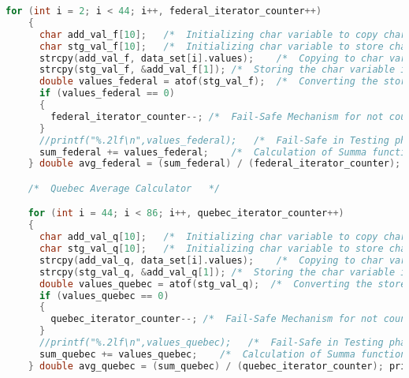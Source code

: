 \begin{lstlisting}[language=C, caption=\textit{CPS 188 Term Project Source Code}]
    for (int i = 2; i < 44; i++, federal_iterator_counter++)
    {
      char add_val_f[10];   /*  Initializing char variable to copy char pointer to char variable type   */
      char stg_val_f[10];   /*  Initializing char variable to store char to char recieved from char pointer */
      strcpy(add_val_f, data_set[i].values);    /*  Copying to char variable from char pointer variable */
      strcpy(stg_val_f, &add_val_f[1]); /*  Storing the char variable in another char variable to manipulate string literals    */
      double values_federal = atof(stg_val_f);  /*  Converting the stored char variable to a float type varaible data type for mathematical computational maniupulation */
      if (values_federal == 0)
      {
        federal_iterator_counter--; /*  Fail-Safe Mechanism for not counting the iterations in the iterating counter factor if the condition is met [CONDITION IS ONLY SATISFIED IF THE atof FUNCTION RETURN 0, IFF THE Var(char) = NULL]   */
      }
      //printf("%.2lf\n",values_federal);   /*  Fail-Safe in Testing phase to verify succinctity of the values being read from atof function    */
      sum_federal += values_federal;    /*  Calculation of Summa function of all data points being read that are not NULL   */
    } double avg_federal = (sum_federal) / (federal_iterator_counter); printf("Federal Average: %.3lf\n", avg_federal); /*  Calculation of the Average function from the previous Summa function and iterator counter function as inputs    */

    /*  Quebec Average Calculator   */

    for (int i = 44; i < 86; i++, quebec_iterator_counter++)
    {
      char add_val_q[10];   /*  Initializing char variable to copy char pointer to char variable type   */
      char stg_val_q[10];   /*  Initializing char variable to store char to char recieved from char pointer */
      strcpy(add_val_q, data_set[i].values);    /*  Copying to char variable from char pointer variable */
      strcpy(stg_val_q, &add_val_q[1]); /*  Storing the char variable in another char variable to manipulate string literals    */
      double values_quebec = atof(stg_val_q);  /*  Converting the stored char variable to a float type varaible data type for mathematical computational maniupulation */
      if (values_quebec == 0)
      {
        quebec_iterator_counter--; /*  Fail-Safe Mechanism for not counting the iterations in the iterating counter factor if the condition is met [CONDITION IS ONLY SATISFIED IF THE atof FUNCTION RETURN 0, IFF THE Var(char) = NULL]   */
      }
      //printf("%.2lf\n",values_quebec);   /*  Fail-Safe in Testing phase to verify succinctity of the values being read from atof function    */
      sum_quebec += values_quebec;    /*  Calculation of Summa function of all data points being read that are not NULL   */
    } double avg_quebec = (sum_quebec) / (quebec_iterator_counter); printf("Quebec Average: %.3lf\n", avg_quebec);


\end{lstlisting}
